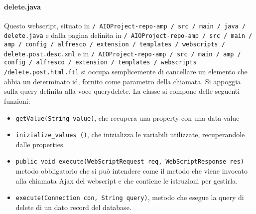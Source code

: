 \paragraph{delete.java}
Questo webscript, situato in \texttt{/ AIOProject-repo-amp / src / main / java / delete.java} e dalla pagina definita in \texttt{/ AIOProject-repo-amp / src / main / amp / config / alfresco / extension / templates / webscripts / delete.post.desc.xml} e in \texttt{/ AIOProject-repo-amp / src / main / amp / config / alfresco / extension / templates / webscripts  /delete.post.html.ftl}  si occupa semplicemente di cancellare un elemento che abbia un determinato id, fornito come parametro della chiamata. Si appoggia sulla query definita alla voce querydelete.
La classe si compone delle seguenti funzioni:
\begin{itemize}
\item \texttt{getValue(String value)}, che recupera una property con una data value
\item \texttt{inizialize\_values ()}, che inizializza le variabili utilizzate, recuperandole dalle properties.
\item \texttt{public void execute(WebScriptRequest req, WebScriptResponse res)} metodo obbligatorio che si può intendere come il metodo che viene invocato alla chiamata Ajax del webscript e che contiene le istruzioni per gestirla.
\item \texttt{execute(Connection con, String query)}, metodo che esegue la query di delete di un dato record del database.
\end{itemize}

